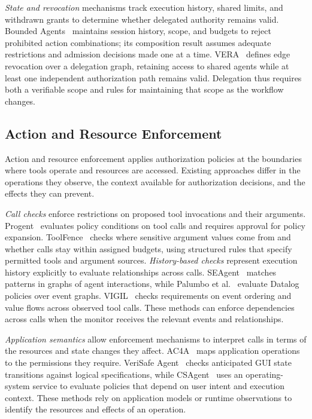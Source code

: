 \emph{State and revocation} mechanisms track execution history, shared limits, and withdrawn grants to determine whether delegated authority remains valid. Bounded Agents~\cite{bounded} maintains session history, scope, and budgets to reject prohibited action combinations; its composition result assumes adequate restrictions and admission decisions made one at a time. VERA~\cite{vera} defines edge revocation over a delegation graph, retaining access to shared agents while at least one independent authorization path remains valid. Delegation thus requires both a verifiable scope and rules for maintaining that scope as the workflow changes.

\subsection{Action and Resource Enforcement}
Action and resource enforcement applies authorization policies at the boundaries where tools operate and resources are accessed. Existing approaches differ in the operations they observe, the context available for authorization decisions, and the effects they can prevent.

\emph{Call checks} enforce restrictions on proposed tool invocations and their arguments. Progent~\cite{progent} evaluates policy conditions on tool calls and requires approval for policy expansion. ToolFence~\cite{toolfence} checks where sensitive argument values come from and whether calls stay within assigned budgets, using structured rules that specify permitted tools and argument sources. \emph{History-based checks} represent execution history explicitly to evaluate relationships across calls. SEAgent~\cite{seagent} matches patterns in graphs of agent interactions, while Palumbo et al.~\cite{pcas} evaluate Datalog policies over event graphs. VIGIL~\cite{vigil} checks requirements on event ordering and value flows across observed tool calls. These methods can enforce dependencies across calls when the monitor receives the relevant events and relationships.

\emph{Application semantics} allow enforcement mechanisms to interpret calls in terms of the resources and state changes they affect. AC4A~\cite{ac4a} maps application operations to the permissions they require. VeriSafe Agent~\cite{verisafe} checks anticipated GUI state transitions against logical specifications, while CSAgent~\cite{csagent} uses an operating-system service to evaluate policies that depend on user intent and execution context. These methods rely on application models or runtime observations to identify the resources and effects of an operation.

